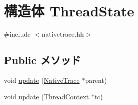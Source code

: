 \hypertarget{structTrace_1_1X86NativeTrace_1_1ThreadState}{
\section{構造体 ThreadState}
\label{structTrace_1_1X86NativeTrace_1_1ThreadState}
}


{\ttfamily \#include $<$nativetrace.hh$>$}\subsection*{Public メソッド}
\begin{DoxyCompactItemize}
\item 
void \hyperlink{structTrace_1_1X86NativeTrace_1_1ThreadState_a85ec503b4f5d7eeddd8cda17abf92e24}{update} (\hyperlink{classTrace_1_1NativeTrace}{NativeTrace} $\ast$parent)
\item 
void \hyperlink{structTrace_1_1X86NativeTrace_1_1ThreadState_ace3d3d91c61ce60aa033e666444d2301}{update} (\hyperlink{classThreadContext}{ThreadContext} $\ast$tc)
\end{DoxyCompactItemize}
